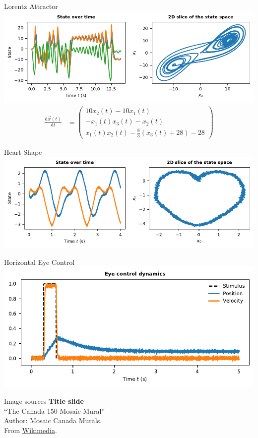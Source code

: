 \documentclass[handout,aspectratio=169]{beamer}
\begin{document}
	\begin{frame}{Lorentz Attractor}
		\centering
		\includegraphics[width=\textwidth]{media/example_lorentz.pdf}
		\begin{align*}
			\frac{\mathrm{d}\vec x(t)}{\mathrm{d}t} &= \begin{pmatrix}
			10 x_2(t)-10x_1(t) \\
			-x_1(t) x_3(t)-x_2(t) \\
			x_1(t) x_2(t) - \frac{8}{3}(x_3(t)+28)-28
			\end{pmatrix}
		\end{align*}
	\end{frame}

	\begin{frame}{Heart Shape}
		\centering
		\includegraphics[width=\textwidth]{media/example_heart.pdf}
	\end{frame}

	\begin{frame}{Horizontal Eye Control}
		\centering
		\includegraphics[width=\textwidth]{media/example_eye_control.pdf}
	\end{frame}

	\backupbegin

	\begin{frame}[noframenumbering]{Image sources}
		\small
		\textbf{Title slide}\\\enquote{The Canada 150 Mosaic Mural}\\Author: Mosaic Canada Murals.\\From \href{https://commons.wikimedia.org/wiki/File:Canada_150_Mosaic_Engine.jpg}{Wikimedia}.
	\end{frame}


	\backupend
	
\end{document}
